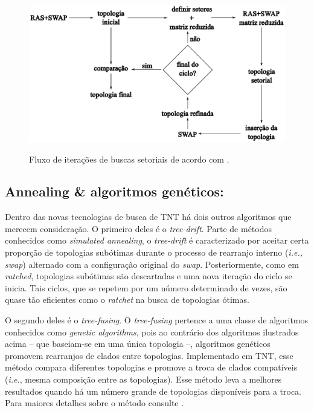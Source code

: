 \begin{refsection}



  \begin{figure}[H]
       \centering
      {\includegraphics[scale=0.80]{figures/tut5/sectorial_search.eps}}
	{\caption[Fluxo de iterações de buscas setoriais.]{Fluxo de iterações de buscas setoriais de acordo com \textcite{Goloboff_1999}.}\label{tut5:fig:secsearch}}
  \end{figure}



\subsection{Annealing \& algoritmos genéticos:}

Dentro das novas tecnologias de busca de TNT há dois outros algoritmos que merecem consideração. O primeiro deles é o \textit{tree-drift}. Parte de métodos conhecidos como \textit{simulated annealing}, o \textit{tree-drift} é caracterizado por aceitar certa proporção de topologias subótimas durante o processo de rearranjo interno (\textit{i.e., swap}) alternado com a configuração original do \textit{swap}. Posteriormente, como em \textit{ratched}, topologias subótimas são descartadas e uma nova iteração do ciclo se inicia. Tais ciclos, que se repetem por um número determinado de vezes, são quase tão eficientes como o \textit{ratchet} na busca de topologias ótimas.

O segundo deles é o \textit{tree-fusing}. O \textit{tree-fusing} pertence a uma classe de algoritmos conhecidos como \textit{genetic algorithms}, pois ao contrário dos algoritmos ilustrados acima -- que baseiam-se em uma única topologia --, algoritmos genéticos promovem rearranjos de clados entre topologias. Implementado em TNT, esse método compara diferentes topologias e promove a troca de clados compatíveis (\textit{i.e.}, mesma composição entre as topologias). Esse método leva a melhores resultados quando há um número grande de topologias disponíveis para a troca. Para maiores detalhes sobre o método consulte \textcite{Giribet_2007, Goloboff_1999}.\\



\end{refsection}
